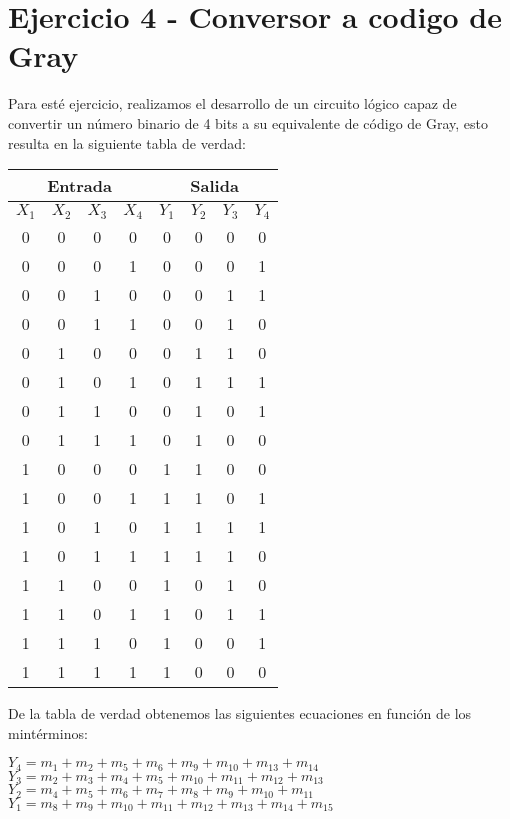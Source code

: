 \section{Ejercicio 4 - Conversor a codigo de Gray}
Para esté ejercicio, realizamos el desarrollo de un circuito lógico capaz de convertir un número binario de 4 bits a su equivalente de código de Gray, esto resulta en la siguiente tabla de verdad:
\begin{table}[H]
	\begin{center}
		\begin{tabular}{|c|c|c|c||c|c|c|c|}
			\hline
			\multicolumn{4}{|c||}{Entrada} & \multicolumn{4}{|c|}{Salida}\\
			\hline
			$X_1$ &	$X_2$ &	$X_3$ &	$X_4$ & $Y_1$ & $Y_2$ & $Y_3$ & $Y_4$\\
			\hline
			0 & 0 & 0 & 0 & 0 & 0 & 0 & 0\\
			\hline
			0 & 0 & 0 & 1 & 0 & 0 & 0 & 1\\
			\hline
			0 & 0 & 1 & 0 & 0 & 0 & 1 & 1\\
			\hline
			0 & 0 & 1 & 1 & 0 & 0 & 1 & 0\\
			\hline
			0 & 1 & 0 & 0 & 0 & 1 & 1 & 0\\
			\hline
			0 & 1 & 0 & 1 & 0 & 1 & 1 & 1\\
			\hline
			0 & 1 & 1 & 0 & 0 & 1 & 0 & 1\\
			\hline
			0 & 1 & 1 & 1 & 0 & 1 & 0 & 0\\
			\hline
			1 & 0 & 0 & 0 & 1 & 1 & 0 & 0\\
			\hline
			1 & 0 & 0 & 1 & 1 & 1 & 0 & 1\\
			\hline
			1 & 0 & 1 & 0 & 1 & 1 & 1 & 1\\
			\hline
			1 & 0 & 1 & 1 & 1 & 1 & 1 & 0\\
			\hline
			1 & 1 & 0 & 0 & 1 & 0 & 1 & 0\\
			\hline
			1 & 1 & 0 & 1 & 1 & 0 & 1 & 1\\
			\hline
			1 & 1 & 1 & 0 & 1 & 0 & 0 & 1\\
			\hline
			1 & 1 & 1 & 1 & 1 & 0 & 0 & 0\\
			\hline
		\end{tabular}
	\end{center}
\end{table}
De la tabla de verdad obtenemos las siguientes ecuaciones en función de los mintérminos:
\begin{center}
	$Y_4=m_1+m_2+m_5+m_6+m_9+m_{10}+m_{13}+m_{14}$\\
	$Y_3=m_2+m_3+m_4+m_5+m_{10}+m_{11}+m_{12}+m_{13}$\\
	$Y_2=m_4+m_5+m_6+m_7+m_8+m_9+m_{10}+m_{11}$\\
	$Y_1=m_8+m_9+m_{10}+m_{11}+m_{12}+m_{13}+m_{14}+m_{15}$\\
\end{center}
